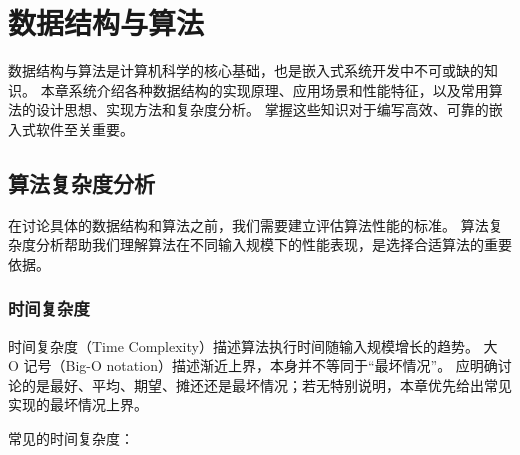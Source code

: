 \chapter{数据结构与算法}

数据结构与算法是计算机科学的核心基础，也是嵌入式系统开发中不可或缺的知识。
本章系统介绍各种数据结构的实现原理、应用场景和性能特征，以及常用算法的设计思想、实现方法和复杂度分析。
掌握这些知识对于编写高效、可靠的嵌入式软件至关重要。

\section{算法复杂度分析}

在讨论具体的数据结构和算法之前，我们需要建立评估算法性能的标准。
算法复杂度分析帮助我们理解算法在不同输入规模下的性能表现，是选择合适算法的重要依据。

\subsection{时间复杂度}


时间复杂度（Time Complexity）描述算法执行时间随输入规模增长的趋势。
大 O 记号（Big-O notation）描述渐近上界，本身并不等同于“最坏情况”。
应明确讨论的是最好、平均、期望、摊还还是最坏情况；若无特别说明，本章优先给出常见实现的最坏情况上界。

常见的时间复杂度：

